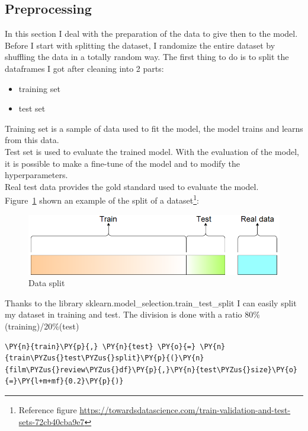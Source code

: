 \subsection{Preprocessing}
In this section I deal with the preparation of the data to give then to the model.
Before I start with splitting the dataset, I randomize the entire dataset by shuffling the data in a totally random way. 
The first thing to do is to split the dataframes I got after cleaning into 2 parts:
\begin{itemize}
    \item training set
    \item test set
\end{itemize}

Training set is a sample of data used to fit the model, the model trains and learns from this data.\\
Test set is used to evaluate the trained model. With the evaluation of the model, it is possible to make a fine-tune of the model and to modify the hyperparameters.\\
Real test data provides the gold standard used to evaluate the model.\\

Figure~\ref{fig:fig_06} shown an example of the split of a dataset\footnote{Reference figure \url{https://towardsdatascience.com/train-validation-and-test-sets-72cb40cba9e7}}: 
\begin{figure}[H]
\centering
\includegraphics[width=1\textwidth]{images/traintestvali.jpg}
\caption{Data split}
\label{fig:fig_06}
\end{figure}
\FloatBarrier

Thanks to the library sklearn.model\_selection.train\_test\_split I can easily split my dataset in training and test. The division is done with a ratio 80\%(training)/20\%(test)

    \begin{tcolorbox}[breakable, size=fbox, boxrule=1pt, pad at break*=1mm,colback=cellbackground, colframe=cellborder]
\begin{Verbatim}[commandchars=\\\{\},fontsize=\small]
\PY{n}{train}\PY{p}{,} \PY{n}{test} \PY{o}{=} \PY{n}{train\PYZus{}test\PYZus{}split}\PY{p}{(}\PY{n}{film\PYZus{}review\PYZus{}df}\PY{p}{,}\PY{n}{test\PYZus{}size}\PY{o}{=}\PY{l+m+mf}{0.2}\PY{p}{)}
\end{Verbatim}
\end{tcolorbox}


